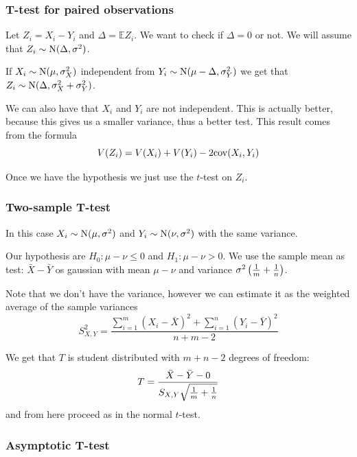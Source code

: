 \documentclass[12pt]{extarticle}
\newcommand{\cov}{{\operatorfont cov}}
\newcommand{\Normal}{{\operatorfont N}}
\begin{document}
\subsubsection{T-test for paired observations}

Let $Z_i = X_i - Y_i$ and $\Delta = \mathbb E Z_i$.
We want to check if $\Delta = 0$ or not.
We will assume that $Z_i \sim \Normal(\Delta, \sigma^2)$.

If $X_i \sim \Normal(\mu, \sigma_X^2)$ independent from $Y_i \sim \Normal(\mu - \Delta, \sigma_Y^2)$
we get that $Z_i \sim \Normal(\Delta, \sigma_X^2 + \sigma_Y^2)$.

We can also have that $X_i$ and $Y_i$ are not independent.
This is actually better, because this gives us a smaller variance, thus a better test.
This result comes from the formula
\begin{equation}
    V(Z_i) = V(X_i) + V(Y_i) - 2 \cov (X_i, Y_i)
\end{equation}

Once we have the hypothesis we just use the $t$-test on $Z_i$.

\subsubsection{Two-sample T-test}

In this case $X_i \sim \Normal(\mu, \sigma^2)$ and $Y_i \sim \Normal(\nu, \sigma^2)$
with the same variance.

Our hypothesis are $H_0 : \mu - \nu \leq 0$ and $H_1 : \mu - \nu > 0$.
We use the sample mean as test: $\bar X- \bar Y$ os gaussian with mean $\mu - \nu$
and variance $\sigma^2 \left(\frac{1}{m} + \frac{1}{n}\right)$.

Note that we don't have the variance, however we can estimate it as the weighted average of the sample variances
\begin{equation}
    S^2_{X, Y} = \frac{\sum^m_{i = 1} (X_i - \bar X)^2 + \sum^n_{i = 1} (Y_i - \bar Y)^2 }{n + m - 2}
\end{equation}

We get that $T$ is student distributed with $m + n - 2$ degrees of freedom:
\begin{equation}
    T = \frac{\bar X - \bar Y - 0}{S_{X, Y} \sqrt{\frac{1}{m} + \frac{1}{n}}}
\end{equation}
and from here proceed as in the normal $t$-test.

\subsubsection{Asymptotic T-test}
\end{document}
